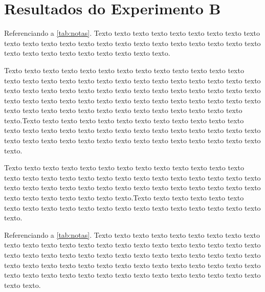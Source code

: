 \section{Resultados do Experimento B}
\label{sec:resultados-do-experimento-b}

Referenciando a \autoref{tab:notas}. Texto texto texto texto texto texto texto texto texto texto texto texto texto texto texto texto texto texto texto texto texto texto texto texto texto texto texto texto texto texto texto texto.

\begin{table}[!ht]	
	\captionsetup{width=11.3cm}%
\end{table}

Texto texto texto texto texto texto texto texto texto texto texto texto texto texto texto texto texto texto texto texto texto texto texto texto texto texto texto texto texto texto texto texto texto texto texto texto texto texto texto texto texto texto texto texto texto texto texto texto texto texto texto texto texto texto texto texto texto texto texto texto texto texto texto texto texto texto texto texto texto.Texto texto texto texto texto texto texto texto texto texto texto texto texto texto texto texto texto texto texto texto texto texto texto texto texto texto texto texto texto texto texto texto texto texto texto texto texto texto texto texto texto.

Texto texto texto texto texto texto texto texto texto texto texto texto texto texto texto texto texto texto texto texto texto texto texto texto texto texto texto texto texto texto texto texto texto texto texto texto texto texto texto texto texto texto texto texto texto texto texto texto.Texto texto texto texto texto texto texto texto texto texto texto texto texto texto texto texto texto texto texto texto texto.

Referenciando a \autoref{tab:notas}. Texto texto texto texto texto texto texto texto texto texto texto texto texto texto texto texto texto texto texto texto texto texto texto texto texto texto texto texto texto texto texto texto texto texto texto texto texto texto texto texto texto texto texto texto texto texto texto texto texto texto texto texto texto texto texto texto texto texto texto texto texto texto texto texto texto texto texto.